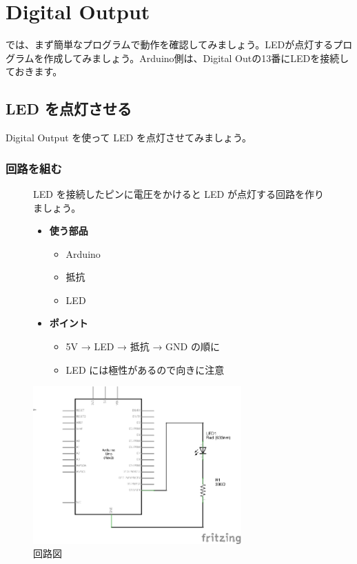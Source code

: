 \documentclass[11pt,a4paper]{jarticle}
\begin{document}
\section{Digital Output}
では、まず簡単なプログラムで動作を確認してみましょう。LEDが点灯するプログラムを作成してみましょう。Arduino側は、Digital Outの13番にLEDを接続しておきます。

\subsection*{LED を点灯させる}
Digital Output を使って LED を点灯させてみましょう。

\subsubsection*{回路を組む}
\begin{figure}[h!]
 \begin{minipage}{0.5\columnwidth}
  LED を接続したピンに電圧をかけると LED が点灯する回路を作りましょう。
  \begin{itemize}
   \item \textbf{使う部品}
	 \begin{itemize}
	  \item Arduino
	  \item 抵抗
	  \item LED
	 \end{itemize}
   \item \textbf{ポイント}
	 \begin{itemize}
	  \item 5V → LED → 抵抗 → GND の順に
	  \item LED には極性があるので向きに注意
	 \end{itemize}
  \end{itemize}
 \end{minipage}
 \begin{minipage}{0.5\columnwidth}
  \centering
  \includegraphics[width=80mm]{img/02_led.eps}
  \caption{回路図}
 \end{minipage}
\end{figure}
\end{document}
